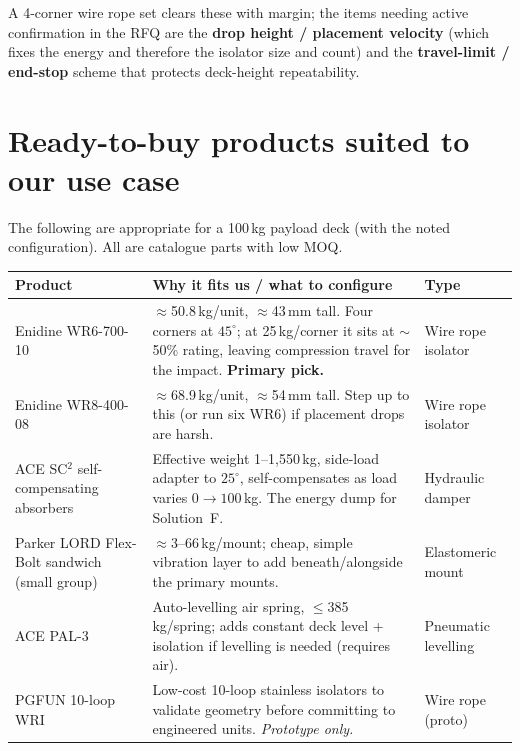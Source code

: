 \documentclass[11pt,a4paper]{article}
\begin{document}
\noindent A 4-corner wire rope set clears these with margin; the items needing active confirmation in the
RFQ are the \textbf{drop height / placement velocity} (which fixes the energy and therefore the isolator
size and count) and the \textbf{travel-limit / end-stop} scheme that protects deck-height repeatability.

\section{Ready-to-buy products suited to our use case}
The following are appropriate for a 100\,kg payload deck (with the noted configuration). All are
catalogue parts with low MOQ.

\begin{center}\small
\renewcommand{\arraystretch}{1.3}
\begin{tabularx}{\linewidth}{@{}p{3.2cm}Y p{2.5cm}@{}}
\toprule
\textbf{Product} & \textbf{Why it fits us / what to configure} & \textbf{Type} \\
\midrule
{}
Enidine WR6-700-10~\cite{wr6} &
$\approx$50.8\,kg/unit, $\approx$43\,mm tall. Four corners at $45^{\circ}$; at 25\,kg/corner it sits at
$\sim$50\% rating, leaving compression travel for the impact. \textbf{Primary pick.} & Wire rope isolator \\
Enidine WR8-400-08~\cite{wr8} &
$\approx$68.9\,kg/unit, $\approx$54\,mm tall. Step up to this (or run six WR6) if placement drops are
harsh. & Wire rope isolator \\
ACE SC$^2$ self-compensating absorbers~\cite{acesc} &
Effective weight 1--1{,}550\,kg, side-load adapter to $25^{\circ}$, self-compensates as load varies
$0\rightarrow100$\,kg. The energy dump for Solution~F. & Hydraulic damper \\
Parker LORD Flex-Bolt sandwich (small group)~\cite{lord} &
$\approx$3--66\,kg/mount; cheap, simple vibration layer to add beneath/alongside the primary mounts. &
Elastomeric mount \\
ACE PAL-3~\cite{acepal} &
Auto-levelling air spring, $\leq$385\,kg/spring; adds constant deck level + isolation if levelling is
needed (requires air). & Pneumatic levelling \\
PGFUN 10-loop WRI~\cite{pgfun} &
Low-cost 10-loop stainless isolators to validate geometry before committing to engineered units. \emph{Prototype only.} & Wire rope (proto) \\
\bottomrule
\end{tabularx}
\end{center}
\end{document}
